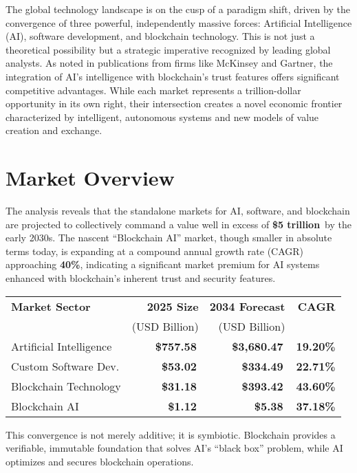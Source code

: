 \documentclass[11pt,a4paper]{report}
\newcommand{\marketvalue}[2]{\textcolor{trust}{\textbf{\$#1}}\,\textcolor{darkgray}{#2}}
\newcommand{\cagr}[1]{\textcolor{sun}{\textbf{#1\%}}}
\begin{document}
The global technology landscape is on the cusp of a paradigm shift, driven by the convergence of three powerful, independently massive forces: Artificial Intelligence (AI), software development, and blockchain technology. This is not just a theoretical possibility but a strategic imperative recognized by leading global analysts. As noted in publications from firms like McKinsey and Gartner, the integration of AI's intelligence with blockchain's trust features offers significant competitive advantages. While each market represents a trillion-dollar opportunity in its own right, their intersection creates a novel economic frontier characterized by intelligent, autonomous systems and new models of value creation and exchange.

\section*{Market Overview}
The analysis reveals that the standalone markets for AI, software, and blockchain are projected to collectively command a value well in excess of \marketvalue{5 trillion}{} by the early 2030s. The nascent ``Blockchain AI'' market, though smaller in absolute terms today, is expanding at a compound annual growth rate (CAGR) approaching \cagr{40}, indicating a significant market premium for AI systems enhanced with blockchain's inherent trust and security features.

\begin{marketfigure}
\centering
\begin{tabular}{lrrr}
\toprule
\textbf{Market Sector} & \textbf{2025 Size} & \textbf{2034 Forecast} & \textbf{CAGR} \\
& (USD Billion) & (USD Billion) & \\
\midrule
Artificial Intelligence & \marketvalue{757.58}{} & \marketvalue{3,680.47}{} & \cagr{19.20} \\
Custom Software Dev. & \marketvalue{53.02}{} & \marketvalue{334.49}{} & \cagr{22.71} \\
Blockchain Technology & \marketvalue{31.18}{} & \marketvalue{393.42}{} & \cagr{43.60} \\
Blockchain AI & \marketvalue{1.12}{} & \marketvalue{5.38}{} & \cagr{37.18} \\
\bottomrule
\end{tabular}
\end{marketfigure}

This convergence is not merely additive; it is symbiotic. Blockchain provides a verifiable, immutable foundation that solves AI's ``black box'' problem, while AI optimizes and secures blockchain operations.
\end{document}
